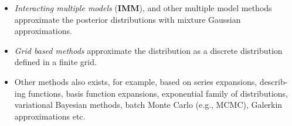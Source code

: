 \documentclass[10pt]{llncs}
\begin{document}
\begin{itemize}
\item \textit{Interacting multiple models} (\textbf{IMM}), and other multiple model methods approximate the posterior distributions with mixture Gaussian approximations.
\item \textit{Grid based methods} approximate the distribution as a discrete distribution
defined in a finite grid.
\item Other methods also exists, for example, based on series expansions, describ-
ing functions, basis function expansions, exponential family of distributions,
variational Bayesian methods, batch Monte Carlo (e.g., MCMC), Galerkin
approximations etc.
\end{itemize}




\newpage











%
  
\end{document}
